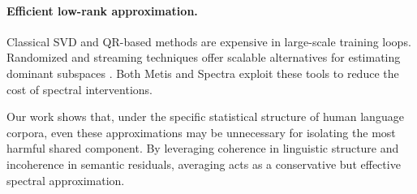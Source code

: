 \paragraph{Efficient low-rank approximation.}
Classical SVD and QR-based methods are expensive in large-scale training loops.
Randomized and streaming techniques offer scalable alternatives for estimating
dominant subspaces \citep{halko2011randomized,tropp2012user,oja1982pca}.
Both Metis and Spectra exploit these tools to reduce the cost of spectral
interventions.

Our work shows that, under the specific statistical structure of human language
corpora, even these approximations may be unnecessary for isolating the most
harmful shared component.
By leveraging coherence in linguistic structure and incoherence in semantic
residuals, averaging acts as a conservative but effective spectral
approximation.